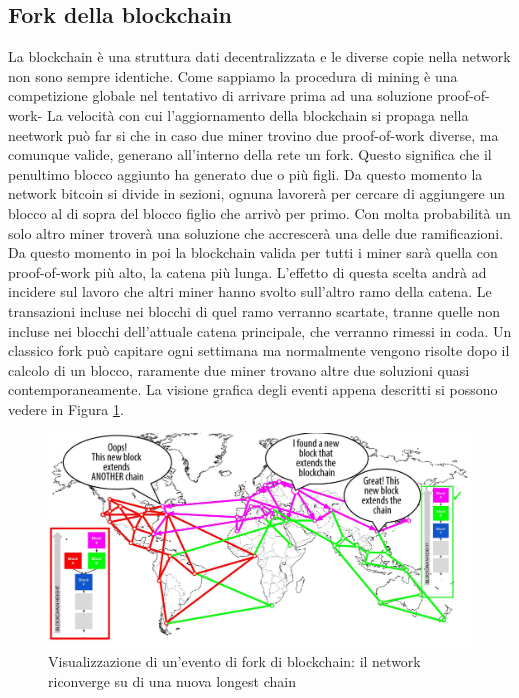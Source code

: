 \subsection{Fork della blockchain}
La blockchain è una struttura dati decentralizzata e le diverse copie nella network non sono sempre identiche. Come sappiamo la procedura di mining è una competizione globale nel tentativo di arrivare prima ad una soluzione proof-of-work- La velocità con cui l'aggiornamento della blockchain si propaga nella neetwork può far si che in caso due miner trovino due proof-of-work diverse, ma comunque valide, generano all'interno della rete un fork. Questo significa che il penultimo blocco aggiunto ha generato due o più figli. Da questo momento la network bitcoin si divide in sezioni, ognuna lavorerà per cercare di aggiungere un blocco al di sopra del blocco figlio che arrivò per primo. Con molta probabilità un solo altro miner troverà una soluzione che accrescerà una delle due ramificazioni. Da questo momento in poi la blockchain valida per tutti i miner sarà quella con proof-of-work più alto, la catena più lunga. L'effetto di questa scelta andrà ad incidere sul lavoro che altri miner hanno svolto sull'altro ramo della catena. Le transazioni incluse nei blocchi di quel ramo verranno scartate, tranne quelle non incluse nei blocchi dell'attuale catena principale, che verranno rimessi in coda. Un classico fork può capitare ogni settimana ma normalmente vengono risolte dopo il calcolo di un blocco, raramente due miner trovano altre due soluzioni quasi contemporaneamente. La visione grafica degli eventi appena descritti si possono vedere in Figura \ref{fig:fork-blockchain}.
\begin{figure}
	\centering
	\includegraphics[width=1\linewidth]{Immagini/fork-blockchain}
	\caption[Visualizzazione di un’evento di fork di blockchain]{Visualizzazione di un’evento di fork di blockchain: il network riconverge su di una nuova longest chain}
	\label{fig:fork-blockchain}
\end{figure}

